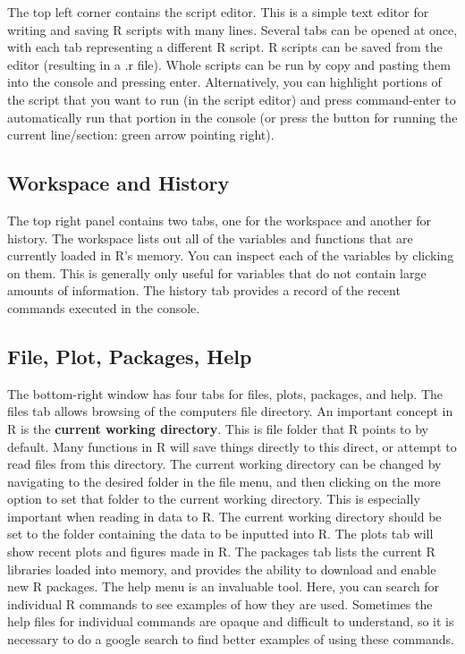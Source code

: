\documentclass[]{book}
\theoremstyle{definition}
\theoremstyle{definition}
\theoremstyle{definition}
\theoremstyle{remark}
\begin{document}
The top left corner contains the script editor. This is a simple text
editor for writing and saving R scripts with many lines. Several tabs
can be opened at once, with each tab representing a different R script.
R scripts can be saved from the editor (resulting in a .r file). Whole
scripts can be run by copy and pasting them into the console and
pressing enter. Alternatively, you can highlight portions of the script
that you want to run (in the script editor) and press command-enter to
automatically run that portion in the console (or press the button for
running the current line/section: green arrow pointing right).

\subsection{Workspace and History}\label{workspace-and-history}

The top right panel contains two tabs, one for the workspace and another
for history. The workspace lists out all of the variables and functions
that are currently loaded in R's memory. You can inspect each of the
variables by clicking on them. This is generally only useful for
variables that do not contain large amounts of information. The history
tab provides a record of the recent commands executed in the console.

\subsection{File, Plot, Packages, Help}\label{file-plot-packages-help}

The bottom-right window has four tabs for files, plots, packages, and
help. The files tab allows browsing of the computers file directory. An
important concept in R is the \textbf{current working directory}. This
is file folder that R points to by default. Many functions in R will
save things directly to this direct, or attempt to read files from this
directory. The current working directory can be changed by navigating to
the desired folder in the file menu, and then clicking on the more
option to set that folder to the current working directory. This is
especially important when reading in data to R. The current working
directory should be set to the folder containing the data to be inputted
into R. The plots tab will show recent plots and figures made in R. The
packages tab lists the current R libraries loaded into memory, and
provides the ability to download and enable new R packages. The help
menu is an invaluable tool. Here, you can search for individual R
commands to see examples of how they are used. Sometimes the help files
for individual commands are opaque and difficult to understand, so it is
necessary to do a google search to find better examples of using these
commands.
\end{document}
